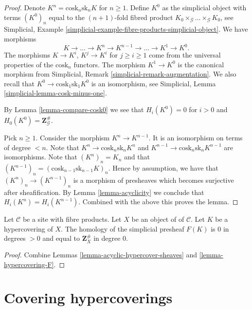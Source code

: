 \begin{proof}
Denote $K^n = \text{cosk}_n \text{sk}_n K$ for $n \geq 1$.
Define $K^0$ as the simplicial object with terms
$(K^0)_n$ equal to the $(n + 1)$-fold fibred product
$K_0 \times_\mathcal{G} \ldots \times_\mathcal{G} K_0$,
see Simplicial,
Example \ref{simplicial-example-fibre-products-simplicial-object}.
We have morphisms
$$
K \longrightarrow \ldots \to K^n \to K^{n - 1} \to \ldots \to K^1 \to K^0.
$$
The morphisms $K \to K^i$, $K^j \to K^i$ for $j \geq i \geq 1$ come
from the universal properties of the $\text{cosk}_n$ functors.
The morphism $K^1 \to K^0$ is the canonical morphism
from
Simplicial, Remark \ref{simplicial-remark-augmentation}.
We also recall that $K^0 \to \text{cosk}_1 \text{sk}_1 K^0$
is an isomorphism, see Simplicial, Lemma \ref{simplicial-lemma-cosk-minus-one}.

\medskip\noindent
By Lemma \ref{lemma-compare-cosk0} we see that
$H_i(K^0) = 0$ for $i > 0$ and $H_0(K^0) = \mathbf{Z}_\mathcal{G}^\#$.

\medskip\noindent
Pick $n \geq 1$. Consider the morphism $K^n \to K^{n - 1}$.
It is an isomorphism on terms of degree $< n$.
Note that $K^n \to \text{cosk}_n \text{sk}_n K^n$ and
$K^{n - 1} \to \text{cosk}_n \text{sk}_n K^{n - 1}$
are isomorphisms. Note that $(K^n)_n = K_n$ and
that $(K^{n - 1})_n = (\text{cosk}_{n - 1} \text{sk}_{n - 1} K)_n$.
Hence by assumption, we have that $(K^n)_n \to (K^{n - 1})_n$
is a morphism of presheaves which becomes surjective after
sheafification. By Lemma \ref{lemma-acyclicity} we conclude that
$H_i(K^n) = H_i(K^{n - 1})$.
Combined with the above this proves the lemma.
\end{proof}

\begin{lemma}
\label{lemma-hypercovering-acyclic}
Let $\mathcal{C}$ be a site with fibre products.
Let $X$ be an object of of $\mathcal{C}$.
Let $K$ be a hypercovering of $X$.
The homology of the simplicial presheaf $F(K)$ is
$0$ in degrees $> 0$ and equal to $\mathbf{Z}_X^\#$
in degree $0$.
\end{lemma}

\begin{proof}
Combine Lemmas \ref{lemma-acyclic-hypercover-sheaves}
and \ref{lemma-hypercovering-F}.
\end{proof}







\section{Covering hypercoverings}
\label{section-covering}

